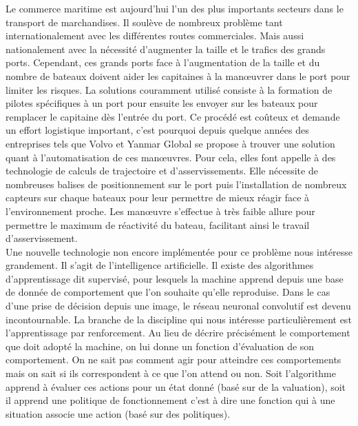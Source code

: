 \documentclass[12pt,a4paper]{extarticle}
\begin{document}
\indent Le commerce maritime est aujourd'hui l'un des plus importants secteurs dans le transport
de marchandises. Il soulève de nombreux problème tant internationalement avec les différentes 
routes commerciales. Mais aussi nationalement avec la nécessité d'augmenter la taille et le 
trafics des grands ports. Cependant, ces grands ports face à l'augmentation de la taille et du 
nombre de bateaux doivent aider les capitaines à la manœuvrer dans le port pour limiter les risques.
La solutions couramment utilisé consiste à la formation de pilotes spécifiques à un port pour 
ensuite les envoyer sur les bateaux pour remplacer le capitaine dès l'entrée du port. 
Ce procédé est coûteux et demande un effort logistique important, c'est pourquoi depuis quelque années des 
entreprises tels que Volvo et Yanmar Global se propose à trouver une solution quant à l'automatisation de 
ces manœuvres. Pour cela, elles font appelle à des technologie de calculs de trajectoire 
et d'asservissements. Elle nécessite de nombreuses balises de positionnement sur le port puis l'installation de nombreux capteurs sur chaque bateaux pour leur
permettre de mieux réagir face à l'environnement proche. Les manœuvre s'effectue à 
très faible allure pour permettre le maximum de réactivité du bateau, facilitant ainsi le 
travail d'asservissement.
\\
\indent Une nouvelle technologie non encore implémentée pour ce problème nous intéresse grandement.
Il s'agit de l'intelligence artificielle. Il existe des algorithmes d'apprentissage dit
supervisé, pour lesquels la machine apprend depuis une base de donnée de comportement que
l'on souhaite qu'elle reproduise. Dans le cas d'une prise de décision depuis une image,
le réseau neuronal convolutif est devenu incontournable. La branche de la discipline qui
nous intéresse particulièrement est l'apprentissage par renforcement. Au lieu de décrire 
précisément le comportement que doit adopté la machine, on lui donne un fonction 
d'évaluation de son comportement. On ne sait pas comment agir pour atteindre ces comportements mais on sait si
ils correspondent à ce que l'on attend ou non. Soit l'algorithme apprend à évaluer ces
actions pour un état donné (basé sur de la valuation), soit il apprend une politique de
fonctionnement c'est à dire une fonction qui à une situation associe une action (basé sur
des politiques). 
 
\end{document}
